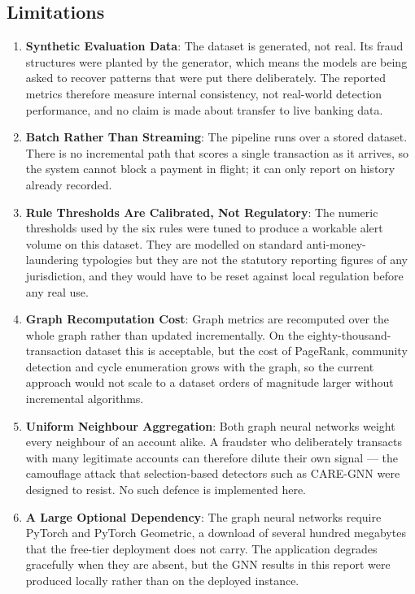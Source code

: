 \subsection{Limitations}\label{sec:limitations}
\begin{enumerate}
  \item \textbf{Synthetic Evaluation Data}: The dataset is generated, not real. Its fraud structures were planted by the generator, which means the models are being asked to recover patterns that were put there deliberately. The reported metrics therefore measure internal consistency, not real-world detection performance, and no claim is made about transfer to live banking data.
  \item \textbf{Batch Rather Than Streaming}: The pipeline runs over a stored dataset. There is no incremental path that scores a single transaction as it arrives, so the system cannot block a payment in flight; it can only report on history already recorded.
  \item \textbf{Rule Thresholds Are Calibrated, Not Regulatory}: The numeric thresholds used by the six rules were tuned to produce a workable alert volume on this dataset. They are modelled on standard anti-money-laundering typologies but they are not the statutory reporting figures of any jurisdiction, and they would have to be reset against local regulation before any real use.
  \item \textbf{Graph Recomputation Cost}: Graph metrics are recomputed over the whole graph rather than updated incrementally. On the eighty-thousand-transaction dataset this is acceptable, but the cost of PageRank, community detection and cycle enumeration grows with the graph, so the current approach would not scale to a dataset orders of magnitude larger without incremental algorithms.
  \item \textbf{Uniform Neighbour Aggregation}: Both graph neural networks weight every neighbour of an account alike. A fraudster who deliberately transacts with many legitimate accounts can therefore dilute their own signal --- the camouflage attack that selection-based detectors such as CARE-GNN were designed to resist. No such defence is implemented here.
  \item \textbf{A Large Optional Dependency}: The graph neural networks require PyTorch and PyTorch Geometric, a download of several hundred megabytes that the free-tier deployment does not carry. The application degrades gracefully when they are absent, but the GNN results in this report were produced locally rather than on the deployed instance.

\end{enumerate}
